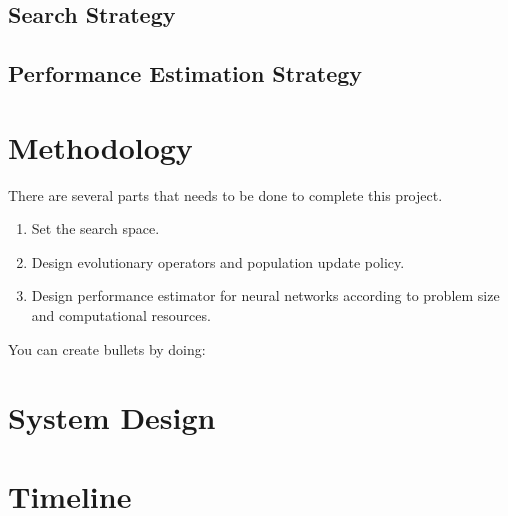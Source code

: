 \documentclass{article}
\begin{document}
\begin{normalsize}
    \subsection{Search Strategy}
    
    \subsection{Performance Estimation Strategy}
    
    \section{Methodology}

    There are several parts that needs to be done to complete this project.
    \begin{enumerate}
      \item Set the search space.
      \item Design evolutionary operators and population update policy.
      \item Design performance estimator for neural networks according to problem size and computational resources.
    \end{enumerate}
      
    
      
    \noindent You can create bullets by doing:

  \section{System Design}
  
  \section{Timeline}
\end{normalsize}
     



\end{document}
